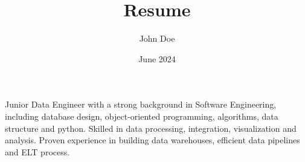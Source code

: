 \documentclass{minimal}
\title{Resume}
\author{John Doe}
\date{June 2024}
\begin{document}
\begin{multicols}{2}
    \columnbreak
\end{multicols}

\begin{multicols}{2}
        
    \columnbreak
    \begin{spacing}{1.5}
    Junior Data Engineer with a strong background in Software Engineering, including database design, object-oriented programming, algorithms, data structure and python. Skilled in data processing, integration, visualization and analysis. Proven experience in building data warehouses, efficient data pipelines and ELT process.
    \end{spacing}
\end{multicols}

\vspace{1em}
\setlength{\columnsep}{1cm}
\end{document}
